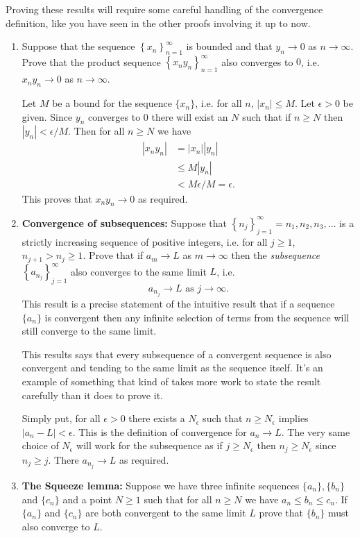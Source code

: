 \documentclass[oneside,10pt]{amsart}
\newcounter{pass}
\begin{document}
{\small Proving these results will require some careful handling of the convergence definition, like you have seen in the other proofs involving it up to now.}

\begin{enumerate}
\setcounter{enumi}{\value{pass}}
\item
Suppose that the sequence $\left \{ x_n \right \}_{n=1}^\infty$ is bounded and that $y_n \to 0$ as $n \to \infty$. Prove that the product sequence $\left \{ x_n y_n \right \}_{n=1}^\infty$ also converges to $0$, i.e. $x_n y_n \to 0$ as $n \to \infty$.
\begin{solution}
Let $M$ be a bound for the sequence $\{x_n\}$, i.e. for all $n$, $|x_n| \leq M$. Let $\epsilon > 0$ be given. Since $y_n$ converges to 0 there will exist an $N$ such that if $n \geq N$ then $|y_n| < \epsilon / M$. Then for all $n \geq N$ we have
\begin{align*}
|x_n y_n | & = |x_n| |y_n| \\
& \leq M |y_n| \\
& < M \epsilon / M = \epsilon.
\end{align*}
This proves that $x_n y_n \to 0$ as required.
\end{solution}
\item
\textbf{Convergence of subsequences: }
Suppose that $\left \{ n_j \right \}_{j=1}^\infty = n_1, n_2, n_3, \dots$ is a strictly increasing sequence of positive integers, i.e. for all $j \geq 1$, $n_{j+1} > n_j \geq 1$. Prove that if $a_m \to L$ as $m \to \infty$ then the \emph{subsequence} $\left \{ a_{n_j} \right \}_{j=1}^\infty$ also converges to the same limit $L$, i.e.
$$ a_{n_j} \to L \text{ as } j \to \infty.$$
This result is a precise statement of the intuitive result that if a sequence $\{a_n\}$ is convergent then any infinite selection of terms from the sequence will still converge to the same limit.
\begin{solution}{This results says that every subsequence of a convergent sequence is also convergent and tending to the same limit as the sequence itself. It's an example of something that kind of takes more work to state the result carefully than it does to prove it.

Simply put, for all $\epsilon > 0$ there exists a $N_\epsilon$ such that $n \geq N_\epsilon$ implies $|a_n - L| < \epsilon $. This is the definition of convergence for $a_n \to L$. The very same choice of $N_\epsilon$ will work for the subsequence as if $j \geq N_\epsilon$ then $n_j \geq N_\epsilon$ since $n_j \geq j$. There $a_{n_j} \to L$ as required.
}\end{solution}
\item
\textbf{The Squeeze lemma: } Suppose we have three infinite sequences $\{a_n\}, \{b_n\}$ and $\{c_n\}$ and a point $N\geq 1$ such that for all $n \geq N$ we have $a_n \leq b_n \leq c_n$. If $\{a_n\}$ and $\{c_n\}$ are both convergent to the same limit $L$ prove that $\{b_n\}$ must also converge to $L$.


\end{enumerate}
\end{document}
